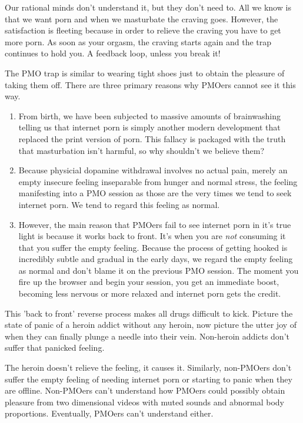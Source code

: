 \documentclass[easypeasy.tex]{subfiles}
\begin{document}
Our rational minds don't understand it, but they don't need to. All we know is that we want porn and when we masturbate the craving goes. However, the satisfaction is fleeting because in order to relieve the craving you have to get more porn. As soon as your orgasm, the craving starts again and the trap continues to hold you. A feedback loop, unless you break it!

The PMO trap is similar to wearing tight shoes just to obtain the pleasure of taking them off. There are three primary reasons why PMOers cannot see it this way.

\begin{enumerate}
  \item From birth, we have been subjected to massive amounts of brainwashing telling us that internet porn is simply another modern development that replaced the print version of porn. This fallacy is packaged with the truth that masturbation isn't harmful, so why shouldn't we believe them?

  \item Because physicial dopamine withdrawal involves no actual pain, merely an empty insecure feeling inseparable from hunger and normal stress, the feeling manifesting into a PMO session as those are the very times we tend to seek internet porn. We tend to regard this feeling as normal.

  \item However, the main reason that PMOers fail to see internet porn in it's true light is because it works back to front. It's when you are \textit{not} consuming it that you suffer the empty feeling. Because the process of getting hooked is incredibly subtle and gradual in the early days, we regard the empty feeling as normal and don't blame it on the previous PMO session. The moment you fire up the browser and begin your session, you get an immediate boost, becoming less nervous or more relaxed and internet porn gets the credit.
  \end{enumerate}

This 'back to front' reverse process makes all drugs difficult to kick. Picture the state of panic of a heroin addict without any heroin, now picture the utter joy of when they can finally plunge a needle into their vein. Non-heroin addicts don't suffer that panicked feeling.

The heroin doesn't relieve the feeling, it causes it. Similarly, non-PMOers don't suffer the empty feeling of needing internet porn or starting to panic when they are offline. Non-PMOers can't understand how PMOers could possibly obtain pleasure from two dimensional videos with muted sounds and abnormal body proportions. Eventually, PMOers can't understand either.
\end{document}
